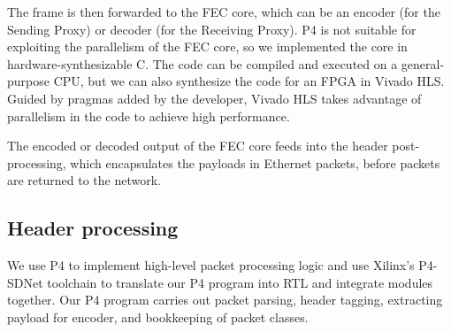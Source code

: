 The frame is then forwarded to the FEC core, which can be an encoder (for the Sending Proxy) or decoder (for the
Receiving Proxy).
P4 is not suitable
for
exploiting the parallelism of the FEC core, so we implemented the core in
hardware-synthesizable C. The code can be compiled and executed on a
general-purpose CPU, but we can also synthesize the code for an FPGA
in Vivado HLS.  Guided by pragmas added by the developer, Vivado HLS takes
advantage of parallelism in the code to 
achieve  high performance.

The encoded or decoded output of the FEC core feeds into the header
post-processing, which encapsulates the payloads in Ethernet packets, before packets are returned to the network.

\subsection{Header processing}
\label{sec:impl:header-processing}
We use P4 to implement high-level packet processing logic and
use Xilinx's P4-SDNet toolchain to translate our P4 program into RTL
and integrate modules together.
%
%
%
%
Our P4 program carries out packet parsing, header tagging,
extracting payload for encoder, and
bookkeeping of packet classes.

